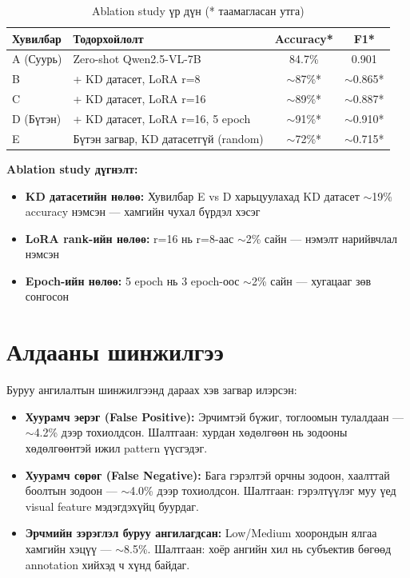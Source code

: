 \begin{table}[h]
\centering
\caption{Ablation study үр дүн (* таамагласан утга)}
\label{tab:ablation}
\begin{tabular}{llcc}
\hline
\textbf{Хувилбар} & \textbf{Тодорхойлолт} & \textbf{Accuracy*} & \textbf{F1*} \\
\hline
A (Суурь)      & Zero-shot Qwen2.5-VL-7B             & 84.7\%  & 0.901 \\
B              & + KD датасет, LoRA r=8               & $\sim$87\%*  & $\sim$0.865* \\
C              & + KD датасет, LoRA r=16              & $\sim$89\%*  & $\sim$0.887* \\
D (Бүтэн)     & + KD датасет, LoRA r=16, 5 epoch     & $\sim$91\%*  & $\sim$0.910* \\
E              & Бүтэн загвар, KD датасетгүй (random) & $\sim$72\%*  & $\sim$0.715* \\
\hline
\end{tabular}
\end{table}

\textbf{Ablation study дүгнэлт:}
\begin{itemize}
    \item \textbf{KD датасетийн нөлөө:} Хувилбар E vs D харьцуулахад KD датасет $\sim$19\% accuracy нэмсэн --- хамгийн чухал бүрдэл хэсэг
    \item \textbf{LoRA rank-ийн нөлөө:} r=16 нь r=8-аас $\sim$2\% сайн --- нэмэлт нарийвчлал нэмсэн
    \item \textbf{Epoch-ийн нөлөө:} 5 epoch нь 3 epoch-оос $\sim$2\% сайн --- хугацааг зөв сонгосон
\end{itemize}

\section{Алдааны шинжилгээ}

Буруу ангилалтын шинжилгээнд дараах хэв загвар илэрсэн:

\begin{itemize}
    \item \textbf{Хуурамч эерэг (False Positive):} Эрчимтэй бүжиг, тоглоомын тулалдаан ---
    $\sim$4.2\% дээр тохиолдсон. Шалтгаан: хурдан хөдөлгөөн нь зодооны хөдөлгөөнтэй ижил pattern үүсгэдэг.

    \item \textbf{Хуурамч сөрөг (False Negative):} Бага гэрэлтэй орчны зодоон, хаалттай
    боолтын зодоон --- $\sim$4.0\% дээр тохиолдсон. Шалтгаан: гэрэлтүүлэг муу үед
    visual feature мэдэгдэхүйц буурдаг.

    \item \textbf{Эрчмийн зэрэглэл буруу ангилагдсан:} Low/Medium хоорондын ялгаа
    хамгийн хэцүү --- $\sim$8.5\%. Шалтгаан: хоёр ангийн хил нь субъектив бөгөөд
    annotation хийхэд ч хүнд байдаг.
\end{itemize}

